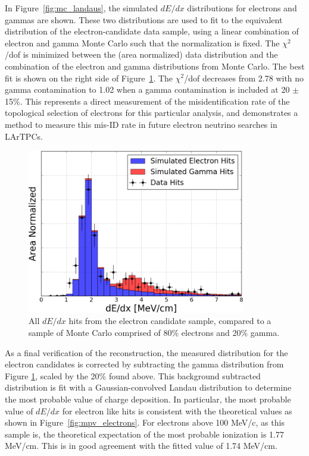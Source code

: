 In Figure~\ref{fig:mc_landaus}, the simulated $dE/dx$ distributions for electrons and gammas are shown.  These two distributions are used to fit to the equivalent distribution of the electron-candidate data sample, using a linear combination of electron and gamma Monte Carlo such that the normalization is fixed.  The $\chi^2$/dof is minimized between the (area normalized) data distribution and the combination of the electron and gamma distributions from Monte Carlo.  The best fit is shown on the right side of Figure~\ref{fig:electron_landau}.  The $\chi^2$/dof decreases from 2.78 with no gamma contamination to 1.02 when a gamma contamination is included at 20 $\pm$ 15\%.  This represents a direct measurement of the misidentification rate of the topological selection of electrons for this particular analysis, and demonstrates a method to measure this mis-ID rate in future electron neutrino searches in LArTPCs.

\begin{figure}[htb]
  \centering
  \includegraphics[width=0.85\textwidth]{emshower_figures/fitted_electron_distribution_trimmed.png}
  \caption[Electron Landau Distribution]{All $dE/dx$ hits from the electron candidate sample, compared to a sample of Monte Carlo comprised of 80\% electrons and 20\% gamma.}
  \label{fig:electron_landau}
\end{figure} 


As a final verification of the reconstruction, the measured distribution for the electron candidates is corrected by subtracting the gamma distribution from Figure \ref{fig:electron_landau}, scaled by the 20\% found above.  This background subtracted distribution is fit with a Gaussian-convolved Landau distribution to determine the most probable value of charge deposition.  In particular, the most probable value of $dE/dx$ for electron like hits is consistent with the theoretical values as shown in Figure~\ref{fig:mpv_electrons}. For electrons above 100 MeV/c, as this sample is, the theoretical expectation of the most probable ionization is 1.77 MeV/cm.  This is in good agreement with the fitted value of 1.74 MeV/cm.

